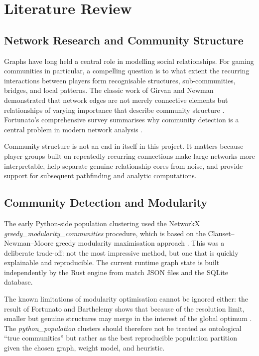 \chapter{Literature Review}

\section{Network Research and Community Structure}

Graphs have long held a central role in modelling social relationships. For gaming communities in particular, a compelling question is to what extent the recurring interactions between players form recognisable structures, sub-communities, bridges, and local patterns. The classic work of Girvan and Newman demonstrated that network edges are not merely connective elements but relationships of varying importance that describe community structure \cite{girvannewman}. Fortunato's comprehensive survey summarises why community detection is a central problem in modern network analysis \cite{fortunato2010}.

Community structure is not an end in itself in this project. It matters because player groups built on repeatedly recurring connections make large networks more interpretable, help separate genuine relationship cores from noise, and provide support for subsequent pathfinding and analytic computations.

\section{Community Detection and Modularity}

The early Python-side population clustering used the NetworkX \textit{greedy\_modularity\_communities} procedure, which is based on the Clauset--Newman--Moore greedy modularity maximisation approach \cite{clauset2004,networkx_greedy}. This was a deliberate trade-off: not the most impressive method, but one that is quickly explainable and reproducible. The current runtime graph state is built independently by the Rust engine from match JSON files and the SQLite database.

The known limitations of modularity optimisation cannot be ignored either: the result of Fortunato and Barthelemy shows that because of the resolution limit, smaller but genuine structures may merge in the interest of the global optimum \cite{fortunato_barthelemy2007}. The \textit{python\_population} clusters should therefore not be treated as ontological ``true communities'' but rather as the best reproducible population partition given the chosen graph, weight model, and heuristic.

